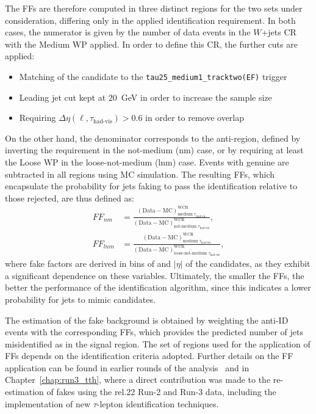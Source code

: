 The FFs are therefore computed in three distinct regions for the two sets under consideration, differing only in the applied identification requirement. 
In both cases, the numerator is given by the number of data events in the $W$+jets CR with the Medium WP applied. In order to define this CR, the further cuts are applied:
\begin{itemize}
  \small
  \item Matching of the \tauhadvis candidate to the \texttt{tau25\_medium1\_tracktwo(EF)} trigger
  \item Leading jet \pt cut kept at 20~GeV in order to increase the sample size
  \item Requiring $\Delta\eta(\ell,\tau_{\text{had-vis}}) > 0.6$ in order to remove overlap
\end{itemize}
On the other hand, the denominator corresponds to the anti-\tauhadvis region, defined by inverting the requirement in the not-medium (nm) case, or by requiring at least the Loose WP in the loose-not-medium (lnm) case. 
Events with genuine \tauhadvis are subtracted in all regions using MC simulation. 
The resulting FFs, which encapsulate the probability for jets faking \tauhadvis to pass the identification relative to those rejected, are thus defined as:
\begin{align}
    FF_{nm} &= 
    \frac{(\text{Data} - \text{MC})^{\text{WCR}}_{\text{medium } \tau_{\text{had-vis}}}}
         {(\text{Data} - \text{MC})^{\text{WCR}}_{\text{not-medium } \tau_{\text{had-vis}}}}, \nonumber \\[6pt]
    FF_{lnm} &= 
    \frac{(\text{Data} - \text{MC})^{\text{WCR}}_{\text{medium } \tau_{\text{had-vis}}}}
         {(\text{Data} - \text{MC})^{\text{WCR}}_{\text{loose-not-medium } \tau_{\text{had-vis}}}},
\label{eq_fakes}
\end{align}
where fake factors are derived in bins of \pt and $|\eta|$ of the \tauhadvis candidates, as they exhibit a significant dependence on these variables. 
Ultimately, the smaller the FFs, the better the performance of the \tauhad identification algorithm, since this indicates a lower probability for jets to mimic \tauhadvis candidates.

The estimation of the fake background is obtained by weighting the \tauhadhad anti-ID events with the corresponding FFs, which provides the predicted number of jets misidentified as \tauhadvis in the signal region. 
The set of regions used for the application of FFs depends on the identification criteria adopted. 
Further details on the FF application can be found in earlier rounds of the \Htautau analysis~\cite{couplings} and in Chapter~\ref{chap:run3_tth}, where a direct contribution was made to the re-estimation of fakes using the rel.22 Run-2 and Run-3 data, including the implementation of new $\tau$-lepton identification techniques.  

